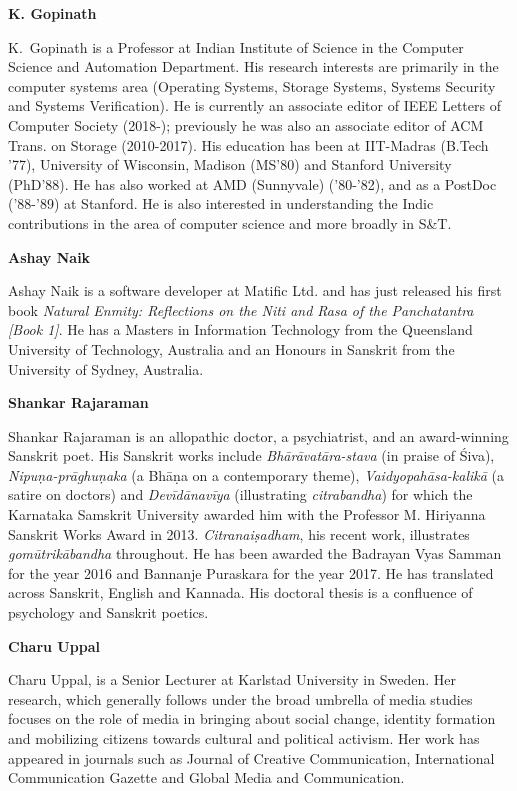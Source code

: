 \bigskip
\noindent
{\large\bf K. Gopinath}
\medskip

K.~Gopinath is a Professor at Indian Institute of Science in the Computer Science and
Automation Department. His research interests are primarily in the computer systems area
(Operating Systems, Storage Systems, Systems Security and Systems Verification). He is
currently an associate editor of IEEE Letters of Computer Society (2018-); previously he was
also an associate editor of ACM Trans. on Storage (2010-2017). His education has been at
IIT-Madras (B.Tech '77), University of Wisconsin, Madison (MS'80) and Stanford University
(PhD'88). He has also worked at AMD (Sunnyvale) ('80-'82), and as a PostDoc ('88-'89) at
Stanford. He is also interested in understanding the Indic contributions in the area of
computer science and more broadly in S\&T.

\bigskip
\noindent
{\large\bf Ashay Naik}
\medskip

Ashay Naik is a software developer at Matific Ltd. and has just released his first book
\textsl{Natural Enmity: Reflections on the Niti and Rasa of the Panchatantra [Book 1]}. He has a
Masters in Information Technology from the Queensland University of Technology,
Australia and an Honours in Sanskrit from the University of Sydney, Australia.

\bigskip
\noindent
{\large\bf Shankar Rajaraman}
\medskip

Shankar Rajaraman is an allopathic doctor, a psychiatrist, and an award-winning Sanskrit
poet. His Sanskrit works include \textsl{Bhārāvatāra-stava} (in praise of Śiva), \textsl{Nipuṇa-prāghuṇaka} (a Bhāṇa on a contemporary theme), \textsl{Vaidyopahāsa-kalikā} (a satire on doctors) and \textsl{Devīdānavīya} (illustrating \textsl{citrabandha}) for which the Karnataka Samskrit University awarded him with the Professor M. Hiriyanna Sanskrit Works Award in 2013. \textsl{Citranaiṣadham}, his recent work, illustrates \textsl{gomūtrikābandha} throughout. He has been awarded the Badrayan Vyas Samman for the year 2016 and Bannanje Puraskara
for the year 2017. He has translated across Sanskrit, English and Kannada. His doctoral thesis is a confluence of psychology and Sanskrit poetics.

\bigskip
\hfill {\large\bf Charu Uppal}
\medskip

Charu Uppal, is a Senior Lecturer at Karlstad University in Sweden. Her research, which generally follows under the broad umbrella of media studies focuses on the role of media in bringing about social change, identity formation and mobilizing citizens towards cultural and political activism. Her work has appeared in journals such as Journal of Creative Communication, International Communication Gazette and Global Media and Communication.
